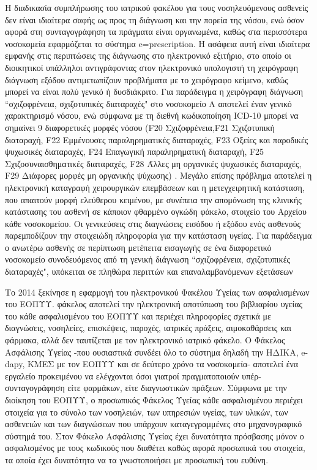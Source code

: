 		Η διαδικασία συμπλήρωσης του ιατρικού φακέλου για τους νοσηλευόμενους ασθενείς δεν είναι ιδιαίτερα σαφής ως προς τη διάγνωση και την πορεία της νόσου, ενώ όσον αφορά στη συνταγογράφηση τα πράγματα είναι οργανωμένα, καθώς στα περισσότερα νοσοκομεία εφαρμόζεται το σύστημα e=prescription. Η ασάφεια αυτή είναι ιδιαίτερα εμφανής στις περιπτώσεις της διάγνωσης στο ηλεκτρονικό εξιτήριο, στο οποίο οι διοικητικοί υπάλληλοι αντιγράφοντας στον ηλεκτρονικό υπολογιστή τη χειρόγραφη διάγνωση εξόδου αντιμετωπίζουν προβλήματα με το χειρόγραφο κείμενο, καθώς μπορεί να είναι πολύ γενικό ή δυσδιάκριτο. Για παράδειγμα η χειρόγραφη διάγνωση ``σχιζοφρένεια, σχιζοτυπικές διαταραχές" στο νοσοκομείο Α αποτελεί έναν γενικό χαρακτηρισμό νόσου, ενώ σύμφωνα με τη διεθνή κωδικοποίηση ICD-10 μπορεί να σημαίνει 9 διαφορετικές μορφές νόσου (F20	Σχιζοφρένεια,F21	Σχιζοτυπική διαταραχή, F22 Εμμένουσες παραληρηματικές διαταραχές, F23 Οξείες και παροδικές ψυχωσικές διαταραχές, F24 Επαγωγική παραληρηματική διαταραχή,  F25 Σχιζοσυναισθηματικές διαταραχές, F28 Άλλες μη οργανικές ψυχωσικές διαταραχές, F29 Διάφορες μορφές μη οργανικής ψύχωσης) \cite{galinos}. Μεγάλο επίσης πρόβλημα αποτελεί η ηλεκτρονική καταγραφή χειρουργικών επεμβάσεων και η μετεγχειρητική κατάσταση, που απαιτούν μορφή ελεύθερου κειμένου, με συνέπεια την απομόνωση της κλινικής κατάστασης του ασθενή σε κάποιον φθαρμένο ογκώδη φάκελο, στοιχείο του Αρχείου κάθε νοσοκομείου. Οι γενικεύσεις στις διαγνώσεις εισόδου ή εξόδου ενός ασθενούς παρεμποδίζουν την στοιχειώδη πληροφορία για την κατάσταση υγείας. Για παράδειγμα ο ανωτέρω ασθενής σε περίπτωση μετέπειτα εισαγωγής σε ένα διαφορετικό νοσοκομείο συνοδευόμενος από τη γενική διάγνωση ``σχιζοφρένεια, σχιζοτυπικές διαταραχές", υπόκειται σε πληθώρα περιττών και επαναλαμβανόμενων εξετάσεων 
		
		Το 2014 ξεκίνησε η εφαρμογή του ηλεκτρονικού Φακέλου Υγείας των ασφαλισμένων του ΕΟΠΥΥ.  φάκελος αποτελεί την ηλεκτρονική αποτύπωση του βιβλιαρίου υγείας του κάθε ασφαλισμένου του ΕΟΠΥΥ και περιέχει πληροφορίες σχετικά με διαγνώσεις, νοσηλείες, επισκέψεις, παροχές, ιατρικές πράξεις, αιμοκαθάρσεις και φάρμακα, αλλά δεν ταυτίζεται με τον ηλεκτρονικό ιατρικό φάκελο. Ο Φάκελος Ασφάλισης Υγείας -που ουσιαστικά συνδέει όλο το σύστημα δηλαδή την ΗΔΙΚΑ, e-dapy, ΚΜΕΣ με τον ΕΟΠΥΥ και σε δεύτερο χρόνο τα νοσοκομεία- αποτελεί ένα εργαλείο προκειμένου να ελέγχονται όσοι γιατροί πραγματοποιούν υπέρ-συνταγογράφηση είτε φαρμάκων, είτε διαγνωστικών πράξεων. Σύμφωνα με την διοίκηση του ΕΟΠΥΥ, ο  προσωπικός Φάκελος Υγείας κάθε ασφαλισμένου περιέχει στοιχεία για το σύνολο των νοσηλειών, των υπηρεσιών υγείας, των υλικών, των ασθενειών και των διαγνώσεων που υπάρχουν καταγεγραμμένες στο μηχανογραφικό σύστημά του. Στον Φάκελο Ασφάλισης Υγείας έχει δυνατότητα πρόσβασης μόνον ο ασφαλισμένος με τους κωδικούς που διαθέτει καθώς αφορά προσωπικά του στοιχεία, τα οποία έχει δυνατότητα να τα γνωστοποιήσει με προσωπική του ευθύνη.
	
